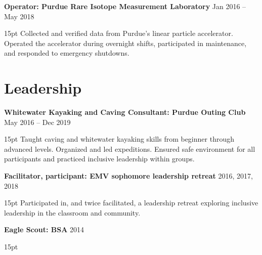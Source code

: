 \documentclass[10pt,letterpaper]{article}
\newcommand{\resumeItem}[3]{
	\textbf{#1} \hfill #2\\
	\begin{adjustwidth}{15pt}{}
	#3
	\end{adjustwidth}
}
\begin{document}
\resumeItem
{Operator: Purdue Rare Isotope Measurement Laboratory}
{Jan 2016 -- May 2018}
{Collected and verified data from Purdue's linear particle accelerator. Operated the accelerator during overnight shifts, participated in maintenance, and responded to emergency shutdowns.}


\section*{Leadership}
\resumeItem
{Whitewater Kayaking and Caving Consultant: Purdue Outing Club}
{May 2016 -- Dec 2019}
{Taught caving and whitewater kayaking skills from beginner through advanced levels. Organized and led expeditions. Ensured safe environment for all participants and practiced inclusive leadership within groups.}

\resumeItem
{Facilitator, participant: EMV sophomore leadership retreat}
{2016, 2017, 2018}
{Participated in, and twice facilitated, a leadership retreat exploring inclusive leadership in the classroom and community.}

\resumeItem
{Eagle Scout: BSA}
{2014}
{}
\end{document}
